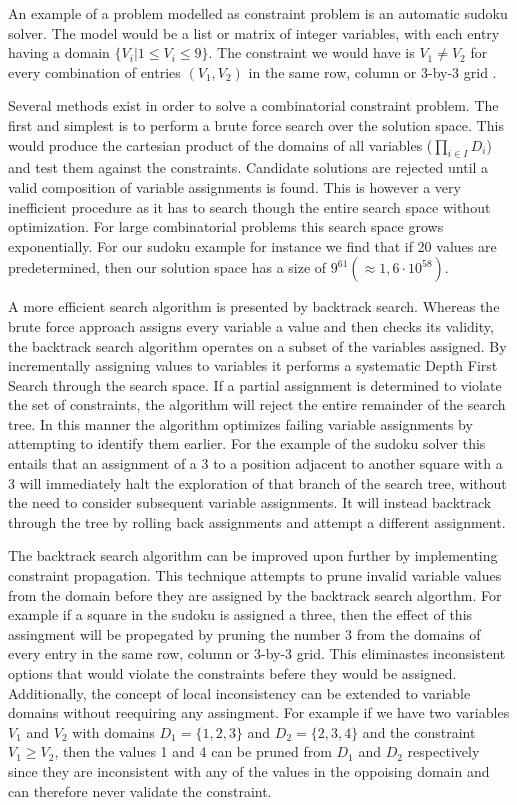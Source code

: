 An example of a problem modelled as constraint problem is an automatic sudoku solver. The model would be a list or matrix of integer variables, with each entry having a domain $\{V_i|1\leq V_i\leq 9\}$. The constraint we would have is $V_1 \neq V_2$ for every combination of entries $(V_1,V_2)$ in the same row, column or 3-by-3 grid .

Several methods exist in order to solve a combinatorial constraint problem. The first and simplest is to perform a brute force search over the solution space. This would produce the cartesian product of the domains of all variables ($\prod_{i\in I} D_i$) and test them against the constraints. Candidate solutions are rejected until a valid composition of variable assignments is found. This is however a very inefficient procedure as it has to search though the entire search space without optimization. For large combinatorial problems this search space grows exponentially. For our sudoku example for instance we find that if 20 values are predetermined, then our solution space has a size of $9^{61}(\approx 1,6\cdot 10^{58})$.

A more efficient search algorithm is presented by backtrack search. Whereas the brute force approach assigns every variable a value and then checks its validity, the backtrack search algorithm operates on a subset of the variables assigned. By incrementally assigning values to variables it performs a systematic Depth First Search through the search space. If a partial assignment is determined to violate the set of constraints, the algorithm will reject the entire remainder of the search tree. In this manner the algorithm optimizes failing variable assignments by attempting to identify them earlier. For the example of the sudoku solver this entails that an assignment of a 3 to a position adjacent to another square with a 3 will immediately halt the exploration of that branch of the search tree, without the need to consider subsequent variable assignments. It will instead backtrack through the tree by rolling back assignments and attempt a different assignment.

The backtrack search algorithm can be improved upon further by implementing constraint propagation. This technique attempts to prune invalid variable values from the domain before they are assigned by the backtrack search algorthm. For example if a square in the sudoku is assigned a three, then the effect of this assingment will be propegated by pruning the number 3 from the domains of every entry in the same row, column or 3-by-3 grid. This eliminastes inconsistent options that would violate the constraints befere they would be assigned. Additionally, the concept of local inconsistency can be extended to variable domains without reequiring any assingment. For example if we have two variables $V_1$ and $V_2$ with domains $D_1=\{1,2,3\}$ and $D_2=\{2,3,4\}$ and the constraint $V_1 \geq V_2$, then the values 1 and 4 can be pruned from $D_1$ and $D_2$ respectively since they are inconsistent with any of the values in the oppoising domain and can therefore never validate the constraint. \cite{constraint_general, constraint_algorithm}
